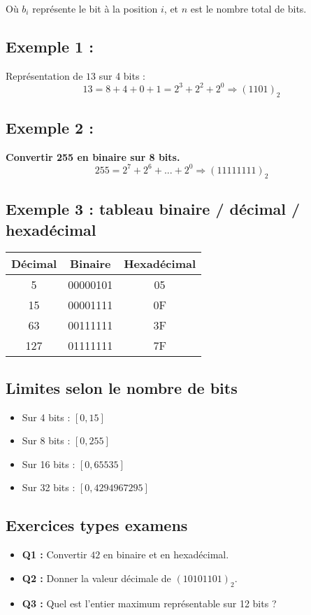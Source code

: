 \documentclass[12pt,a4paper]{article}
\begin{document}
Où $b_i$ représente le bit à la position $i$, et $n$ est le nombre total de bits.

\subsection{Exemple 1 :}
Représentation de $13$ sur 4 bits :
\[ 13 = 8 + 4 + 0 + 1 = 2^3 + 2^2 + 2^0 \Rightarrow (1101)_2 \]

\subsection{Exemple 2 :}
\textbf{Convertir 255 en binaire sur 8 bits.}
\[ 255 = 2^7 + 2^6 + ... + 2^0 \Rightarrow (11111111)_2 \]

\subsection{Exemple 3 : tableau binaire / décimal / hexadécimal}
\begin{tabular}{|c|c|c|}
\hline
Décimal & Binaire & Hexadécimal \\
\hline
5 & 00000101 & 05 \\
15 & 00001111 & 0F \\
63 & 00111111 & 3F \\
127 & 01111111 & 7F \\
\hline
\end{tabular}

\subsection{Limites selon le nombre de bits}
\begin{itemize}
  \item Sur 4 bits : $[0, 15]$
  \item Sur 8 bits : $[0, 255]$
  \item Sur 16 bits : $[0, 65535]$
  \item Sur 32 bits : $[0, 4294967295]$
\end{itemize}

\subsection{Exercices types examens}
\begin{itemize}
  \item \textbf{Q1 :} Convertir $42$ en binaire et en hexadécimal.
  \item \textbf{Q2 :} Donner la valeur décimale de $(10101101)_2$.
  \item \textbf{Q3 :} Quel est l'entier maximum représentable sur 12 bits ?
\end{itemize}
\end{document}
